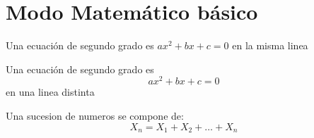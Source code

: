 \documentclass[10pt,a4paper]{article}
\begin{document}
\section{Modo Matemático básico}
Una ecuación de segundo grado es
$ ax^2+bx+c=0$ en la misma linea

Una ecuación de segundo grado es  
$$ ax^2+bx+c=0$$ en una linea distinta


Una sucesion de numeros se compone de: $$ X_n=X_1+X_2+\ldots + X_n $$
\end{document}
